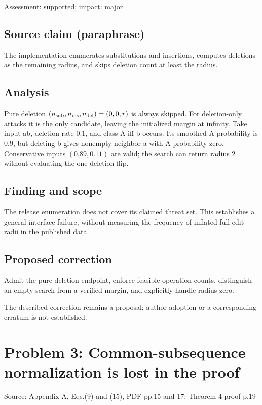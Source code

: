 \documentclass[11pt]{article}
\begin{document}
Assessment: supported; impact: major

\subsection*{Source claim (paraphrase)}

The implementation enumerates substitutions and insertions, computes deletions as the remaining radius, and skips deletion count at least the radius.

\subsection*{Analysis}

Pure deletion \((n_{\rm sub},n_{\rm ins},n_{\rm del})=(0,0,r)\) is always skipped. For deletion-only attacks it is the only candidate, leaving the initialized margin at infinity. Take input ab, deletion rate \(0.1\), and class A iff b occurs. Its smoothed A probability is \(0.9\), but deleting b gives nonempty neighbor a with A probability zero. Conservative inputs \((0.89,0.11)\) are valid; the search can return radius \(2\) without evaluating the one-deletion flip.

\subsection*{Finding and scope}

The release enumeration does not cover its claimed threat set. This establishes a general interface failure, without measuring the frequency of inflated full-edit radii in the published data.

\subsection*{Proposed correction}

Admit the pure-deletion endpoint, enforce feasible operation counts, distinguish an empty search from a verified margin, and explicitly handle radius zero.

The described correction remains a proposal; author adoption or a corresponding erratum is not established.

\section*{Problem 3: Common-subsequence normalization is lost in the proof}

Source: Appendix A, Eqs.(9) and (15), PDF pp.15 and 17; Theorem 4 proof p.19
\end{document}

